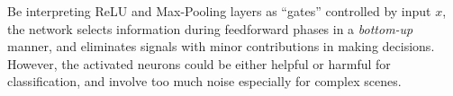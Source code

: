 Be interpreting ReLU and Max-Pooling layers as ``gates'' controlled by input $x$, the network selects information during feedforward phases in a \emph{bottom-up} manner, and eliminates signals with minor contributions in making decisions. However, the activated neurons could be either helpful or harmful for classification, and involve too much noise especially for complex scenes.




